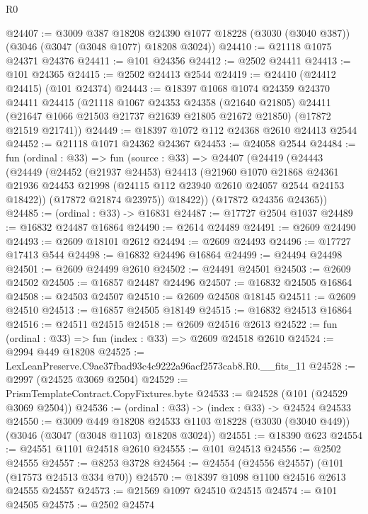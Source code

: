 \begin{lexlean}{R0}
\begin{coremodule}
@24407 := @3009
    @387
    @18208
    @24390
    @1077
    @18228
    (@3030 (@3040 @387))
    (@3046 (@3047 (@3048 @1077) @18208 @3024))
@24410 := @21118 @1075 @24371 @24376
@24411 := @101 @24356
@24412 := @2502 @24411
@24413 := @101 @24365
@24415 := @2502 @24413 @2544
@24419 := @24410 (@24412 @24415) (@101 @24374)
@24443 := @18397
    @1068
    @1074
    @24359
    @24370
    @24411
    @24415
    (@21118
      @1067
      @24353
      @24358
      (@21640 @21805)
      @24411
      (@21647 @1066 @21503 @21737 @21639 @21805 @21672 @21850)
      (@17872 @21519 @21741))
@24449 := @18397 @1072 @112 @24368 @2610 @24413 @2544
@24452 := @21118 @1071 @24362 @24367
@24453 := @24058 @2544
@24484 := fun (ordinal : @33) =>
  fun (source : @33) =>
  @24407
    (@24419
      (@24443
        (@24449
          (@24452
            (@21937 @24453)
            @24413
            (@21960
              @1070
              @21868
              @24361
              @21936
              @24453
              @21998
              (@24115 @112 @23940 @2610 @24057 @2544 @24153 @18422))
            (@17872 @21874 @23975))
          @18422))
      (@17872 @24356 @24365))
@24485 := (ordinal : @33) -> @16831
@24487 := @17727 @2504 @1037
@24489 := @16832 @24487 @16864
@24490 := @2614 @24489
@24491 := @2609 @24490
@24493 := @2609 @18101 @2612
@24494 := @2609 @24493
@24496 := @17727 @17413 @544
@24498 := @16832 @24496 @16864
@24499 := @24494 @24498
@24501 := @2609 @24499 @2610
@24502 := @24491 @24501
@24503 := @2609 @24502
@24505 := @16857 @24487 @24496
@24507 := @16832 @24505 @16864
@24508 := @24503 @24507
@24510 := @2609 @24508 @18145
@24511 := @2609 @24510
@24513 := @16857 @24505 @18149
@24515 := @16832 @24513 @16864
@24516 := @24511 @24515
@24518 := @2609 @24516 @2613
@24522 := fun (ordinal : @33) => fun (index : @33) => @2609 @24518 @2610
@24524 := @2994 @449 @18208
@24525 := LexLeanPreserve.C9ae37fbad93c4c9222a96acf2573cab8.R0.__fits_11
@24528 := @2997 (@24525 @3069 @2504)
@24529 := PrismTemplateContract.CopyFixtures.byte
@24533 := @24528 (@101 (@24529 @3069 @2504))
@24536 := (ordinal : @33) -> (index : @33) -> @24524 @24533
@24550 := @3009
    @449
    @18208
    @24533
    @1103
    @18228
    (@3030 (@3040 @449))
    (@3046 (@3047 (@3048 @1103) @18208 @3024))
@24551 := @18390 @623
@24554 := @24551 @1101 @24518 @2610
@24555 := @101 @24513
@24556 := @2502 @24555
@24557 := @8253 @3728
@24564 := @24554 (@24556 @24557) (@101 (@17573 @24513 @334 @70))
@24570 := @18397 @1098 @1100 @24516 @2613 @24555 @24557
@24573 := @21569 @1097 @24510 @24515
@24574 := @101 @24505
@24575 := @2502 @24574

\end{coremodule}
\end{lexlean}
